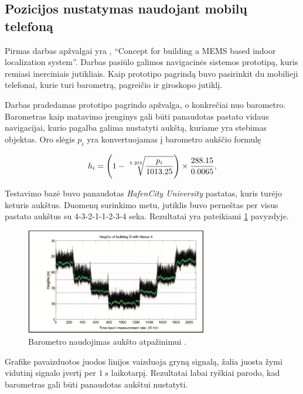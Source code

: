 \subsection{Pozicijos nustatymas naudojant mobilų telefoną}

Pirmas darbas apžvalgai yra \cite{willemsenconcept}, ``Concept for building a MEMS based indoor localization system''. Darbas pasiūlo galimos navigacinės sistemos prototipą, kuris remiasi inerciniais jutikliais. Kaip prototipo pagrindą buvo pasirinkit du mobilieji telefonai, kurie turi barometrą, pagreičio ir giroskopo jutiklį.

Darbas pradedamas prototipo pagrindo apžvalga, o konkrečiai nuo barometro. Barometras kaip matavimo įrenginys gali būti panaudotas pastato vidaus navigacijai, kurio pagalba galima nustatyti aukštą, kuriame yra stebimas objektas. Oro slėgis $p_i$ yra konvertuojamas į barometro aukščio formulę

\begin{equation}
    h_i = \Bigg( 1 - \sqrt[\leftroot{-2}\uproot{2}5.255]{ \frac{p_i}{1013.25} } \Bigg) \times \frac{288.15}{0.0065},
\end{equation}

Testavimo bazė buvo panaudotas \textit{HafenCity University} pastatas, kuris turėjo keturis aukštus. Duomenų surinkimo metu, jutiklis buvo perneštas per visus pastato aukštus su 4-3-2-1-1-2-3-4 seka. Rezultatai yra pateikiami \ref{fig:floor_detection_with_barometer_data} pavyzdyje.

\begin{figure}[H]
    \centering
    \includegraphics[width=300px]{img/floor_detection_with_barometer_data.png}
    \caption{Barometro naudojimas aukšto atpažinimui \cite{willemsenconcept}.}
    \label{fig:floor_detection_with_barometer_data}
\end{figure}

Grafike pavaizduotos juodos linijos vaizduoja gryną signalą, žalia juosta žymi vidutinį signalo įvertį per $1~s$ laikotarpį. Rezultatai labai ryškiai parodo, kad barometras gali būti panaudotas aukštui nustatyti.

